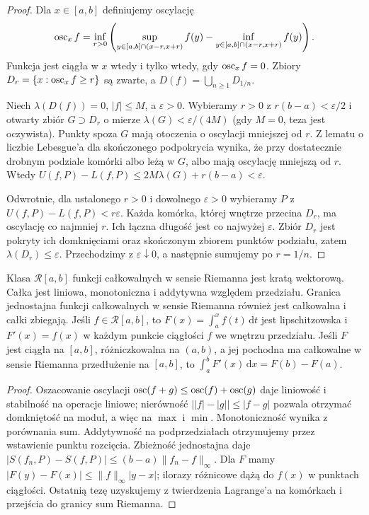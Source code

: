 \begin{proof}
Dla $x\in[a,b]$ definiujemy oscylację \[\operatorname{osc}_x f=\inf_{r>0}\left(\sup_{y\in[a,b]\cap(x-r,x+r)}f(y)-\inf_{y\in[a,b]\cap(x-r,x+r)}f(y)\right).\] Funkcja jest ciągła w $x$ wtedy i tylko wtedy, gdy $\operatorname{osc}_x f=0$. Zbiory $D_r=\{x:\operatorname{osc}_x f\ge r\}$ są zwarte, a $D(f)=\bigcup_{n\ge1}D_{1/n}$.

Niech $\lambda(D(f))=0$, $|f|\le M$, a $\varepsilon>0$. Wybieramy $r>0$ z $r(b-a)<\varepsilon/2$ i otwarty zbiór $G\supset D_r$ o mierze $\lambda(G)<\varepsilon/(4M)$ (gdy $M=0$, teza jest oczywista). Punkty spoza $G$ mają otoczenia o oscylacji mniejszej od $r$. Z lematu o liczbie Lebesgue'a dla skończonego podpokrycia wynika, że przy dostatecznie drobnym podziale komórki albo leżą w $G$, albo mają oscylację mniejszą od $r$. Wtedy $U(f,P)-L(f,P)\le2M\lambda(G)+r(b-a)<\varepsilon$.

Odwrotnie, dla ustalonego $r>0$ i dowolnego $\varepsilon>0$ wybieramy $P$ z $U(f,P)-L(f,P)<r\varepsilon$. Każda komórka, której wnętrze przecina $D_r$, ma oscylację co najmniej $r$. Ich łączna długość jest co najwyżej $\varepsilon$. Zbiór $D_r$ jest pokryty ich domknięciami oraz skończonym zbiorem punktów podziału, zatem $\lambda(D_r)\le\varepsilon$. Przechodzimy z $\varepsilon\downarrow0$, a następnie sumujemy po $r=1/n$.
\end{proof}
\begin{twierdzenie}[Własności]
Klasa $\mathcal R[a,b]$ funkcji całkowalnych w sensie Riemanna jest kratą wektorową. Całka jest liniowa, monotoniczna i addytywna względem przedziału. Granica jednostajna funkcji całkowalnych w sensie Riemanna również jest całkowalna i całki zbiegają. Jeśli $f\in\mathcal R[a,b]$, to $F(x)=\int_a^x f(t)\,\mathrm dt$ jest lipschitzowska i $F'(x)=f(x)$ w każdym punkcie ciągłości $f$ we wnętrzu przedziału. Jeśli $F$ jest ciągła na $[a,b]$, różniczkowalna na $(a,b)$, a jej pochodna ma całkowalne w sensie Riemanna przedłużenie na $[a,b]$, to $\int_a^b F'(x)\,\mathrm dx=F(b)-F(a)$.
\end{twierdzenie}
\begin{proof}
Oszacowanie oscylacji $\operatorname{osc}(f+g)\le\operatorname{osc}(f)+\operatorname{osc}(g)$ daje liniowość i stabilność na operacje liniowe; nierówność $\bigl||f|-|g|\bigr|\le|f-g|$ pozwala otrzymać domkniętość na moduł, a więc na $\max$ i $\min$. Monotoniczność wynika z porównania sum. Addytywność na podprzedziałach otrzymujemy przez wstawienie punktu rozcięcia. Zbieżność jednostajna daje $|S(f_n,P)-S(f,P)|\le(b-a)\|f_n-f\|_\infty$. Dla $F$ mamy $|F(y)-F(x)|\le\|f\|_\infty|y-x|$; ilorazy różnicowe dążą do $f(x)$ w punktach ciągłości. Ostatnią tezę uzyskujemy z twierdzenia Lagrange'a na komórkach i przejścia do granicy sum Riemanna.
\end{proof}
